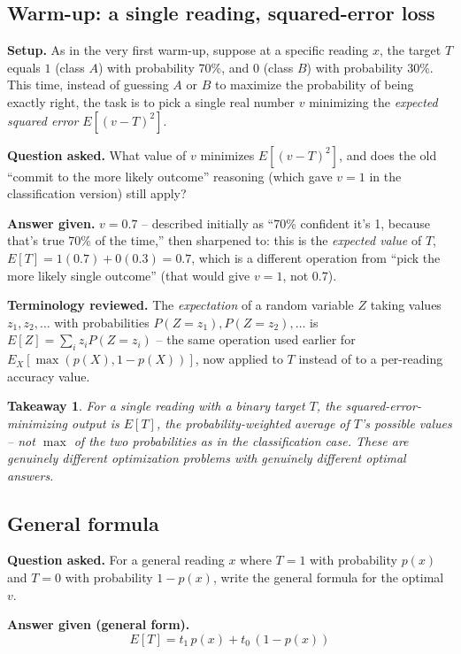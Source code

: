\documentclass[11pt]{article}
\newtheorem*{takeaway}{Takeaway}
\begin{document}
\subsection{Warm-up: a single reading, squared-error loss}

\textbf{Setup.} As in the very first warm-up, suppose at a specific reading
$x$, the target $T$ equals $1$ (class $A$) with probability 70\%, and $0$
(class $B$) with probability 30\%. This time, instead of guessing $A$ or
$B$ to maximize the probability of being exactly right, the task is to pick
a single real number $v$ minimizing the \emph{expected squared error}
$E[(v-T)^2]$.

\textbf{Question asked.} What value of $v$ minimizes $E[(v-T)^2]$, and does
the old ``commit to the more likely outcome'' reasoning (which gave $v=1$
in the classification version) still apply?

\textbf{Answer given.} $v = 0.7$ -- described initially as ``70\% confident
it's 1, because that's true 70\% of the time,'' then sharpened to: this is
the \emph{expected value} of $T$, $E[T] = 1(0.7) + 0(0.3) = 0.7$, which is a
different operation from ``pick the more likely single outcome'' (that
would give $v=1$, not $0.7$).

\textbf{Terminology reviewed.} The \emph{expectation} of a random variable
$Z$ taking values $z_1, z_2, \ldots$ with probabilities $P(Z=z_1),
P(Z=z_2),\ldots$ is $E[Z] = \sum_i z_i P(Z=z_i)$ -- the same operation used
earlier for $E_X[\max(p(X),1-p(X))]$, now applied to $T$ instead of to a
per-reading accuracy value.

\begin{takeaway}
For a single reading with a binary target $T$, the squared-error-minimizing
output is $E[T]$, the probability-weighted average of $T$'s possible
values -- \emph{not} $\max$ of the two probabilities as in the
classification case. These are genuinely different optimization problems
with genuinely different optimal answers.
\end{takeaway}

\subsection{General formula}

\textbf{Question asked.} For a general reading $x$ where $T=1$ with
probability $p(x)$ and $T=0$ with probability $1-p(x)$, write the general
formula for the optimal $v$.

\textbf{Answer given (general form).}
\[
  E[T] = t_1\, p(x) + t_0\,(1-p(x))
\]
\end{document}
